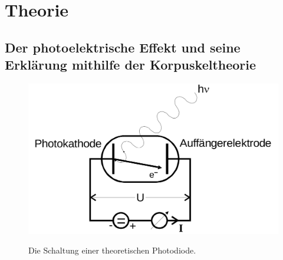
\section{Theorie}
\label{sec:Theorie}


 \subsection{Der photoelektrische Effekt und seine Erklärung mithilfe der Korpuskeltheorie  }


 \begin{figure}
 	\centering
 	\caption{Die Schaltung einer theoretischen Photodiode.}
 	\includegraphics[width=\linewidth-170pt,height=\textheight-170pt,keepaspectratio]{content/Bilder/photodiode.png}
 	\label{fig:photodiode}
 \end{figure}


